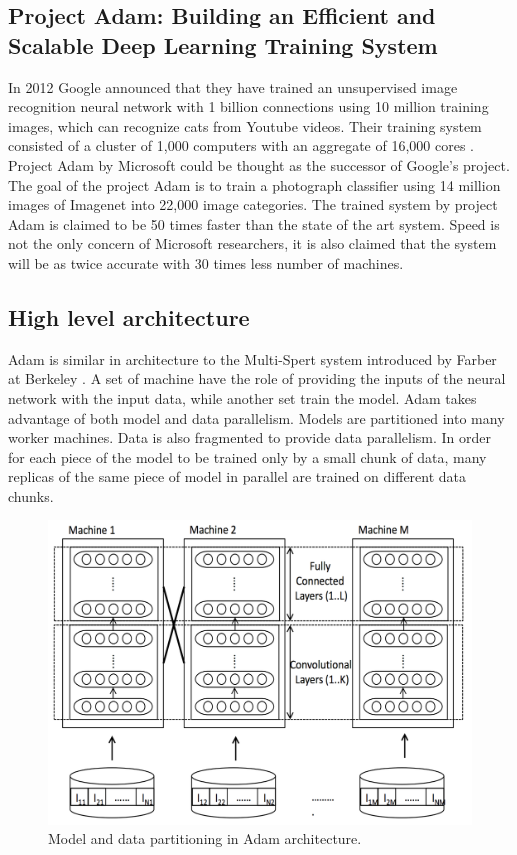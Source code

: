 \documentclass[runningheads,a4paper]{llncs}
\begin{document}
\subsection*{Project Adam: Building an Efficient and Scalable Deep Learning Training System \cite{chilimbi2014project}}
In 2012 Google announced that they have trained an unsupervised image recognition neural network with 1 billion connections using 10 million training images, which can recognize cats from Youtube videos. Their training system consisted of a cluster of 1,000 computers with an aggregate of 16,000 cores \cite{le2013building}.\\

Project Adam by Microsoft could be thought as the successor of Google's project. The goal of the project Adam is to train a photograph classifier using 14 million images of Imagenet \cite{deng2009imagenet} into 22,000 image categories. The trained system by project Adam is claimed to be 50 times faster than the state of the art system. Speed is not the only concern of Microsoft researchers, it is also claimed that the system will be as twice accurate with 30 times less number of machines.\\

\subsection*{High level architecture}
Adam is similar in architecture to the Multi-Spert system introduced by Farber at Berkeley \cite{farber1997parallel}. A set of machine have the role of providing the inputs of the neural network with the input data, while another set train the model. Adam takes advantage of both model and data parallelism. Models are partitioned into many worker machines. Data is also fragmented to provide data parallelism. In order for each piece of the model to be trained only by a small chunk of data, many replicas of the same piece of model in parallel are trained on different data chunks.\\
\begin{figure}[h]
	\includegraphics[scale=0.3]{./images/adam_parallelization.png}
	\centering
	\caption{Model and data partitioning in Adam architecture\cite{chilimbi2014project}.}
	\label{fig:adam_parallelism}
\end{figure}
\end{document}

